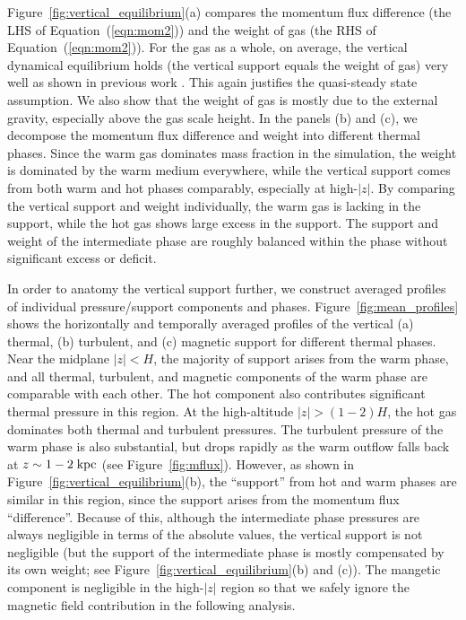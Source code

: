 \documentclass[twocolumn]{aastex62}
\newcommand\kpc{\;{\rm kpc}}
\begin{document}
Figure~\ref{fig:vertical_equilibrium}(a) compares the momentum flux difference (the LHS of Equation~(\ref{eqn:mom2})) and the weight of gas (the RHS of Equation~(\ref{eqn:mom2})). For the gas as a whole, on average, the vertical dynamical equilibrium holds (the vertical support equals the weight of gas) very well as shown in previous work \citep[e.g.,][]{KOK13,KO15b}. This again justifies the quasi-steady state assumption. We also show that the weight of gas is mostly due to the external gravity, especially above the gas scale height. In the panels (b) and (c), we decompose the momentum flux difference and weight into different thermal phases. Since the warm gas dominates mass fraction in the simulation, the weight is dominated by the warm medium everywhere, while the vertical support comes from both warm and hot phases comparably, especially at high-$|z|$. By comparing the vertical support and weight individually, the warm gas is lacking in the support, while the hot gas shows large excess in the support. The support and weight of the intermediate phase are roughly balanced within the phase without significant excess or deficit.

In order to anatomy the vertical support further, we construct averaged profiles of individual pressure/support components and phases. Figure~\ref{fig:mean_profiles} shows the horizontally and temporally averaged profiles of the vertical (a) thermal, (b) turbulent, and (c) magnetic support for different thermal phases. Near the midplane $|z|<H$, the majority of support arises from the warm phase, and all thermal, turbulent, and magnetic components of the warm phase are comparable with each other. The hot component also contributes significant thermal pressure in this region. At the high-altitude $|z|>(1-2)H$, the hot gas dominates both thermal and turbulent pressures. The turbulent pressure of the warm phase is also substantial, but drops rapidly as the warm outflow falls back at $z\sim1-2\kpc$ (see Figure~\ref{fig:mflux}). However, as shown in Figure~\ref{fig:vertical_equilibrium}(b), the ``support'' from hot and warm phases are similar in this region, since the support arises from the momentum flux ``difference''. Because of this, although the intermediate phase pressures are always negligible in terms of the absolute values, the vertical support is not negligible (but the support of the intermediate phase is mostly compensated by its own weight; see Figure~\ref{fig:vertical_equilibrium}(b) and (c)). The mangetic component is negligible in the high-$|z|$ region so that we  safely ignore the magnetic field contribution in the following analysis.
\end{document}
